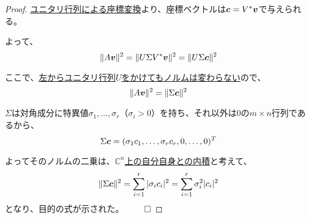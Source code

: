 \documentclass[../../../topic_linear-algebra]{subfiles}
\begin{document}
\begin{proof}
  \hyperref[thm:unitary-coordinate-transform]{ユニタリ行列による座標変換}より、座標ベクトルは$\vb*{c} = V^* \vb*{v}$で与えられる。
  
  よって、
  \begin{equation*}
    \| A \vb*{v} \|^2 = \| U \Sigma V^* \vb*{v} \|^2 = \| U \Sigma \vb*{c} \|^2
  \end{equation*}
  
  ここで、\hyperref[thm:unitary-characterized-by-norm-invariance]{左からユニタリ行列$U$をかけてもノルムは変わらない}ので、
  \begin{equation*}
    \| A \vb*{v} \|^2 = \| \Sigma \vb*{c} \|^2
  \end{equation*}
  
  $\Sigma$は対角成分に特異値$\sigma_1, \dots, \sigma_r$（$\sigma_i > 0$）を持ち、それ以外は0の$m \times n$行列であるから、
  \begin{equation*}
    \Sigma \vb*{c} = (\sigma_1 c_1, \dots, \sigma_r c_r, 0, \dots, 0)^T
  \end{equation*}
  
  よってそのノルムの二乗は、\hyperref[def:standard-inner-product-Cn]{$\mathbb{C}^n$上の自分自身との内積}と考えて、
  \begin{equation*}
    \| \Sigma \vb*{c} \|^2 = \sum_{i=1}^r |\sigma_i c_i|^2 = \sum_{i=1}^r \sigma_i^2 |c_i|^2
  \end{equation*}
  となり、目的の式が示された。 $\qed$
\end{proof}
\end{document}
